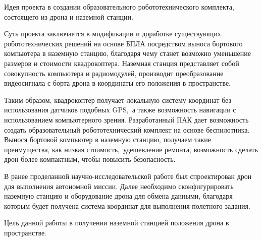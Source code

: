 
Идея проекта в создании образовательного робототехнического комплекта, состоящего из дрона и наземной станции. 

Суть проекта заключается в модификации и доработке существующих робототехнических решений на основе БПЛА посредством выноса бортового компьютера в наземную станцию, благодаря чему станет возможно уменьшение размеров и стоимости квадрокоптера.
Наземная станция представляет собой совокупность компьютера и радиомодулей, производит преобразование видеосигнала с борта дрона в координаты его положения в пространстве.

Таким образом, квадрокоптер получает локальную систему координат без использования датчиков подобных GPS, а также возможность навигации с использованием компьютерного зрения.
Разработанный ПАК дает возможность создать образовательный робототехнический комплект на основе беспилотника. Вынося бортовой компьютер в наземную станцию, получаем такие преимущества, как низкая стоимость, удешевление ремонта, возможность сделать дрон более компактным, чтобы повысить безопасность.

В ранее проделанной научно-исследовательской работе был спроектирован дрон для выполнения автономной миссии. Далее необходимо сконфигурировать наземную станцию и оборудование дрона для обмена данными, благодаря которым будет получена система координат для выполнения полетного задания.

Цель данной работы в получении наземной станцией положения дрона в пространстве.